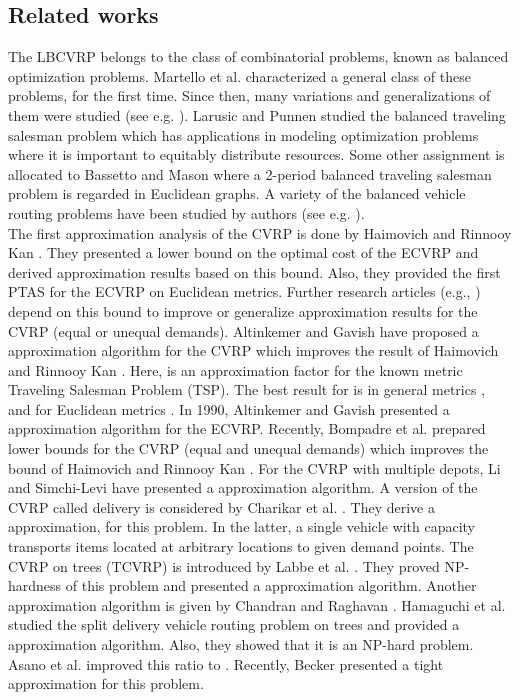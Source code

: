 \subsection{Related works}
\indent  The LBCVRP belongs to the class of combinatorial problems, known as balanced optimization problems. Martello et al. \cite{Martello} characterized a general class of these problems, for the first time. Since then, many variations and generalizations of them were studied (see e.g. \cite{Ahuja,Aydin,Cappanera}). Larusic and Punnen \cite{Larusic} studied the balanced traveling salesman problem which has applications in modeling optimization problems where it is important to equitably distribute resources. Some other assignment is allocated to Bassetto and Mason \cite{Bassetto} where a 2-period balanced traveling salesman problem is regarded in Euclidean graphs. A variety of the balanced vehicle routing problems have been studied by authors (see e.g. \cite{Borgulya,Chen2009,Chen2008,Lee,Matl,Tsouros,Yousefikhoshbakht}). \\ 
\indent The first approximation analysis of the CVRP is done by Haimovich and Rinnooy Kan \cite{Haimovich1985}. They presented a lower bound on the optimal cost of the ECVRP and derived approximation results based on this bound. Also, they provided the first PTAS for the ECVRP on Euclidean metrics. Further research articles (e.g., \cite{Altinkemer1990,Altinkemer1987,Li}) depend on this bound to improve or generalize approximation results for the CVRP (equal or unequal demands). Altinkemer and Gavish \cite{Altinkemer1987} have proposed a approximation algorithm for the CVRP which improves the result of Haimovich and Rinnooy Kan \cite{Haimovich1985}. Here,  is an approximation factor for the known metric Traveling Salesman Problem (TSP). The best result for  is  in general metrics \cite{Christofides}, and  for Euclidean metrics \cite{Mitchell}. In 1990, Altinkemer and Gavish \cite{Altinkemer1990} presented a approximation algorithm for the ECVRP. Recently, Bompadre et al. \cite{Bompadre} prepared lower bounds for the CVRP (equal and unequal demands) which improves the bound of Haimovich and Rinnooy Kan \cite{Haimovich1985}. For the CVRP with multiple depots, Li and Simchi-Levi \cite{Li} have presented a approximation algorithm. A version of the CVRP called delivery is considered by Charikar et al. \cite{Charikar}. They derive a approximation, for this problem. In the latter, a single vehicle with capacity  transports  items located at arbitrary locations to given demand points. The CVRP on trees (TCVRP) is introduced by Labbe et al. \cite{Labbe}. They proved NP-hardness of this problem and presented a approximation algorithm. Another approximation algorithm is given by Chandran and Raghavan \cite{Chandran}. Hamaguchi et al. \cite{Hamaguchi} studied the split delivery vehicle routing problem on trees and provided a approximation algorithm. Also, they showed that it is an NP-hard problem. Asano et al. \cite{Asano2001} improved this ratio to . Recently, Becker \cite{Becker} presented a tight approximation for this problem. \\

